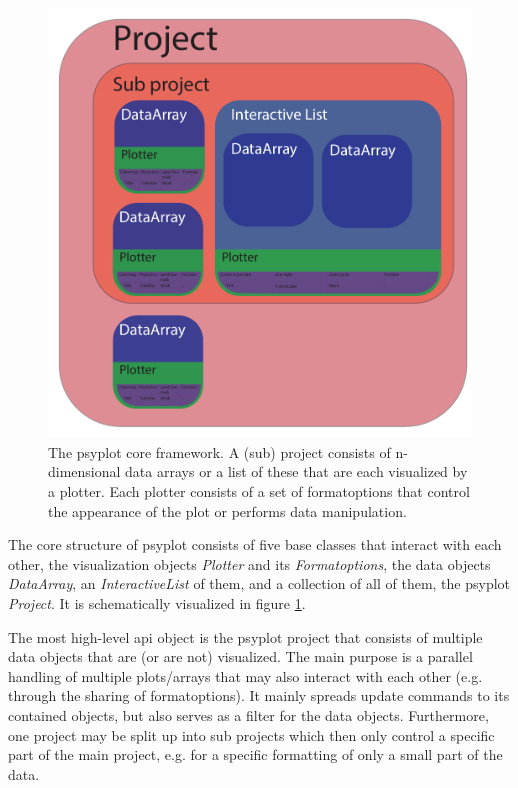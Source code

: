 \begin{refsection}
\begin{figure}
	\includegraphics[width=\linewidth]{psyplot-figures/psyplot_framework.pdf}
	\caption[The psyplot core framework]{The psyplot core framework. A (sub) project consists of n-dimensional data arrays or a list of these that are each visualized by a plotter. Each plotter consists of a set of formatoptions that control the appearance of the plot or performs data manipulation.}
	\label{fig:psyplot-core}
\end{figure}

The core structure of psyplot consists of five base classes that interact with each other, the visualization objects \textit{Plotter} and its \textit{Formatoptions}, the data objects \textit{DataArray}, an \textit{InteractiveList} of them, and a collection of all of them, the psyplot \textit{Project}. It is schematically visualized in figure \ref{fig:psyplot-core}.

The most high-level \gls{api} object is the psyplot project that consists of multiple data objects that are (or are not) visualized. The main purpose is a parallel handling of multiple plots/arrays that may also interact with each other (e.g. through the sharing of formatoptions). It mainly spreads update commands to its contained objects, but also serves as a filter for the data objects. Furthermore, one project may be split up into sub projects which then only control a specific part of the main project, e.g. for a specific formatting of only a small part of the data.


\end{refsection}
